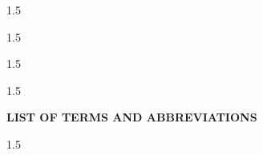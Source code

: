 \documentclass[12pt,oneside,a4paper,semicolon]{book} %
\begin{document}


\newpage
\begin{spacing}{1.5}


\newpage

\newpage

\newpage
{}

\newpage
\end{spacing}
\newpage
\begin{spacing}{1.5}
	\tableofcontents	
\end{spacing}
\newpage
\let\origaddvspace\addvspace
\renewcommand{\addvspace}[1]{}
\begin{spacing}{1.5}
	\setcounter{lofdepth}{2} \listoffigures
\end{spacing}
\newpage
\begin{spacing}{1.5}
	\setcounter{lotdepth}{2} \listoftables 	
\end{spacing}

\clearpage


\begin{center}
    \textbf{LIST OF TERMS AND ABBREVIATIONS}
\end{center}
\vspace{0.5cm}

\printglossary%

\mainmatter


\begin{spacing}{1.5}
	















\end{spacing}
%
% 

\newpage 



%		
\end{document}
